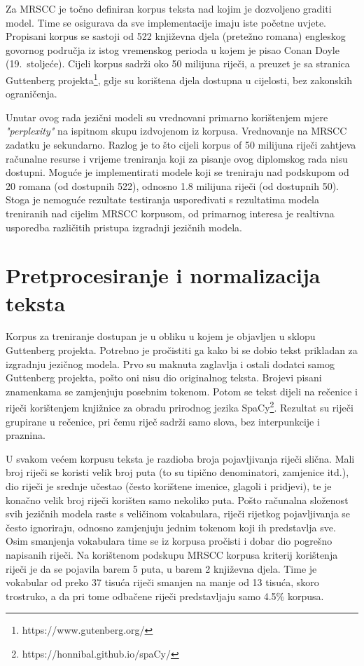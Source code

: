 \documentclass[times, utf8, diplomski, numeric]{fer}
\begin{document}
Za MRSCC je točno definiran korpus teksta nad kojim je dozvoljeno graditi model. Time se osigurava da sve implementacije imaju iste početne uvjete. Propisani korpus se sastoji od 522 književna djela (pretežno romana) engleskog govornog područja iz istog vremenskog perioda u kojem je pisao Conan Doyle (19.\ stoljeće). Cijeli korpus sadrži oko 50 milijuna riječi, a preuzet je sa stranica Guttenberg projekta\footnote{https://www.gutenberg.org/}, gdje su korištena djela dostupna u cijelosti, bez zakonskih ograničenja.

Unutar ovog rada jezični modeli su vrednovani primarno korištenjem mjere \textit{"perplexity"} na ispitnom skupu izdvojenom iz korpusa. Vrednovanje na MRSCC zadatku je sekundarno. Razlog je to što cijeli korpus of 50 milijuna riječi zahtjeva računalne resurse i vrijeme treniranja koji za pisanje ovog diplomskog rada nisu dostupni. Moguće je implementirati modele koji se treniraju nad podskupom od 20 romana (od dostupnih 522), odnosno 1.8 milijuna riječi (od dostupnih 50). Stoga je nemoguće rezultate testiranja uspoređivati s rezultatima modela treniranih nad cijelim MRSCC korpusom, od primarnog interesa je realtivna usporedba različitih pristupa izgradnji jezičnih modela.

\section{Pretprocesiranje i normalizacija teksta}

Korpus za treniranje dostupan je u obliku u kojem je objavljen u sklopu Guttenberg projekta. Potrebno je pročistiti ga kako bi se dobio tekst prikladan za izgradnju jezičnog modela. Prvo su maknuta zaglavlja i ostali dodatci samog Guttenberg projekta, pošto oni nisu dio originalnog teksta. Brojevi pisani znamenkama se zamjenjuju posebnim tokenom. Potom se tekst dijeli na rečenice i riječi korištenjem knjižnice za obradu prirodnog jezika SpaCy\footnote{https://honnibal.github.io/spaCy/}. Rezultat su riječi grupirane u rečenice, pri čemu riječ sadrži samo slova, bez interpunkcije i praznina.

U svakom većem korpusu teksta je razdioba broja pojavljivanja riječi slična. Mali broj riječi se koristi velik broj puta (to su tipično denominatori, zamjenice itd.), dio riječi je srednje učestao (često korištene imenice, glagoli i pridjevi), te je konačno velik broj riječi korišten samo nekoliko puta. Pošto računalna složenost svih jezičnih modela raste s veličinom vokabulara, riječi rijetkog pojavljivanja se često ignoriraju, odnosno zamjenjuju jednim tokenom koji ih predstavlja sve. Osim smanjenja vokabulara time se iz korpusa pročisti i dobar dio pogrešno napisanih riječi. Na korištenom podskupu MRSCC korpusa kriterij korištenja riječi je da se pojavila barem 5 puta, u barem 2 književna djela. Time je vokabular od preko 37 tisuća riječi smanjen na manje od 13 tisuća, skoro trostruko, a da pri tome odbačene riječi predstavljaju samo 4.5\% korpusa.
\end{document}
